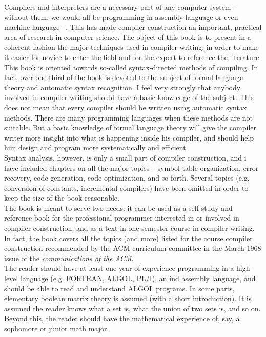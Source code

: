 \documentclass[../main.tex]{subfiles}
\begin{document}
Compilers and interpreters are a necessary part of any computer system -- without them, we would all be programming in assembly language or even machine language --. This has made compiler construction an important, practical area of research in computer science. The object of this book is to present in a coherent fashion the major techniques used in compiler writing, in order to make it easier for novice to enter the field and for the expert to reference the literature.\\

This book is oriented towards so-called syntax-directed methods of compiling. In fact, over one third of the book is devoted to the subject of formal language theory and automatic syntax recognition. I feel very strongly that anybody involved in compiler writing should have a basic knowledge of the subject. This does not mean that every compiler should be written using automatic syntax methods. There are many programming languages when these methods are not suitable. But a basic knowledge of formal language theory will give the compiler writer more insight into what is happening inside his compiler, and should help him design and program more systematically and efficient.\\

Syntax analysis, however, is only a small part of compiler construction, and i have included chapters on all the major topics -- symbol table organization, error recovery, code generation, code optimization, and so forth. Several topics (e.g. conversion of constants, incremental compilers) have been omitted in order to keep the size of the book reasonable.\\

The book is meant to serve two needs: it can be used as a self-study and reference book for the professional programmer interested in or involved in compiler construction, and as a text in one-semester course in compiler writing. In fact, the book covers all the topics (and more) listed for the course compiler construction recommended by the ACM curriculum committee in the March 1968 issue of the \textit{communications of the ACM}.\\

The reader should have at least one year of experience programming in a high-level language (e.g. FORTRAN, ALGOL, PL/I), an ind assembly language, and should be able to read and understand ALGOL programs. In some parts, elementary boolean matrix theory is assumed (with a short introduction). It is assumed the reader knows what a set is, what the union of two sets is, and so on. Beyond this, the reader should have the mathematical experience of, say, a sophomore or junior math major.\\
\end{document}
